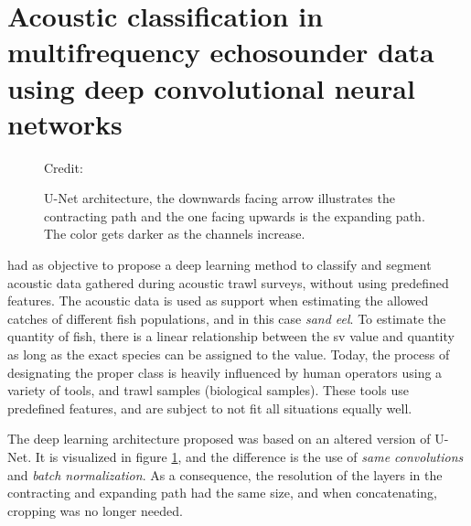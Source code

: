     
\section{Acoustic classification in multifrequency echosounder data using deep convolutional neural networks} \label{unet_paper_acoustic}
    
        \begin{figure}[H]
        \centering
        
        \caption[U-Net architecture]{U-Net architecture, the downwards facing arrow illustrates the contracting path and the one facing upwards is the expanding path. The color gets darker as the channels increase.}
      	\medskip 
        \label{unet__brautset_fig}
        \hspace*{15pt}\hbox{\scriptsize Credit: \citeauthor{brautaset2020acoustic}\cite{brautaset2020acoustic}}
    \end{figure}
    
    \citeauthor{brautaset2020acoustic}\cite{brautaset2020acoustic} had as objective to propose a deep learning method to classify and segment acoustic data gathered during acoustic trawl surveys, without using predefined features. The acoustic data is used as support when estimating the allowed catches of different fish populations, and in this case \textit{sand eel}. To estimate the quantity of fish, there is a linear relationship between the \gls{sv} value and quantity as long as the exact species can be assigned to the value. Today, the process of designating the proper class is heavily influenced by human operators using a variety of tools, and trawl samples (biological samples). These tools use predefined features, and are subject to not fit all situations equally well. 
    
    The deep learning architecture proposed was based on an altered version of \citeauthor{unet_ronneberger2015}\cite{unet_ronneberger2015} U-Net\cite{brautaset2020acoustic}. It is visualized in figure \ref{unet__brautset_fig}, and the difference is the use of \textit{same convolutions} and \textit{batch normalization}. As a consequence, the resolution of the layers in the contracting and expanding path had the same size, and when concatenating, cropping was no longer needed. 
    
